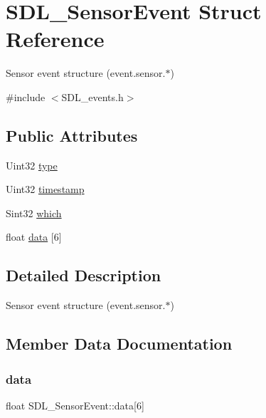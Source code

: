 \hypertarget{structSDL__SensorEvent}{}\section{S\+D\+L\+\_\+\+Sensor\+Event Struct Reference}
\label{structSDL__SensorEvent}


Sensor event structure (event.\+sensor.$\ast$)  




{\ttfamily \#include $<$S\+D\+L\+\_\+events.\+h$>$}

\subsection*{Public Attributes}
\begin{DoxyCompactItemize}
\item 
Uint32 \hyperlink{structSDL__SensorEvent_a0173d64fbe5299cad956298faf3fb0f9}{type}
\item 
Uint32 \hyperlink{structSDL__SensorEvent_a7de6c2b4d4791f5553b5de225293ceb5}{timestamp}
\item 
Sint32 \hyperlink{structSDL__SensorEvent_aa1c130192bad9b316f811f2d138b3b22}{which}
\item 
float \hyperlink{structSDL__SensorEvent_ab08c166baa755f66b13df0d66ed6d29b}{data} \mbox{[}6\mbox{]}
\end{DoxyCompactItemize}


\subsection{Detailed Description}
Sensor event structure (event.\+sensor.$\ast$) 

\subsection{Member Data Documentation}
\mbox{\label{structSDL__SensorEvent_ab08c166baa755f66b13df0d66ed6d29b}} 
\subsubsection{\texorpdfstring{data}{data}}
{\footnotesize\ttfamily float S\+D\+L\+\_\+\+Sensor\+Event\+::data\mbox{[}6\mbox{]}}

